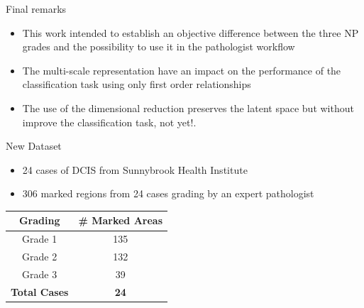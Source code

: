 \documentclass[usenames,dvipsnames]{beamer}
\begin{document}



  
  



\begin{frame}{Final remarks}

\begin{itemize}
    \item This work intended to establish an objective difference between the three NP grades and the possibility to use it in the pathologist workflow 
    \item The multi-scale representation have an impact on the performance of the classification task using only first order relationships
    \item The use of the dimensional reduction preserves the latent space but without improve the classification task, not yet!.
\end{itemize}
    
\end{frame}

\begin{frame}{New Dataset}

\begin{itemize}
\item 24 cases of DCIS from Sunnybrook Health Institute
\item 306 marked regions from 24 cases grading by an expert pathologist 
\end{itemize}
    \begin{table}[]
\begin{tabular}{|c|c|}
\hline
Grading              & \# Marked Areas \\ \hline
Grade 1              & 135             \\ \hline
Grade 2              & 132             \\ \hline
Grade 3              & 39              \\ \hline\hline
\textbf{Total Cases} & \textbf{24}     \\ \hline
\end{tabular}
\end{table}
\end{frame}
\end{document}
